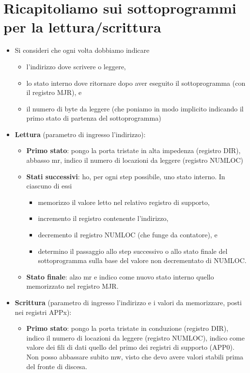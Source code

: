 \documentclass[11pt]{report}
\begin{document}
\section{Ricapitoliamo sui sottoprogrammi per la lettura/scrittura}
\begin{itemize}
\item Si consideri che ogni volta dobbiamo indicare
\begin{itemize}
\item l'indirizzo dove scrivere o leggere,
\item lo stato interno dove ritornare dopo aver eseguito il sottoprogramma (con il registro MJR), e 
\item il numero di byte da leggere (che poniamo in modo implicito indicando il primo stato di partenza del sottoprogramma)
\end{itemize}
\item \textbf{Lettura} (parametro di ingresso l'indirizzo):
\begin{itemize}
\item \textbf{Primo stato}: pongo la porta tristate in alta impedenza (registro DIR), abbasso mr, indico il numero di locazioni da leggere (registro NUMLOC)
\item \textbf{Stati successivi}: ho, per ogni step possibile, uno stato interno. In ciascuno di essi
\begin{itemize}
\item memorizzo il valore letto nel relativo registro di supporto,
\item incremento il registro contenente l'indirizzo,
\item decremento il registro NUMLOC (che funge da contatore), e
\item determino il passaggio allo step successivo o allo stato finale del sottoprogramma sulla base del valore non decrementato di NUMLOC.
\end{itemize}
\item \textbf{Stato finale}: alzo mr e indico come nuovo stato interno quello memorizzato nel registro MJR.
\end{itemize}
\item \textbf{Scrittura} (parametro di ingresso l'indirizzo e i valori da memorizzare, posti nei registri APPx):
\begin{itemize}
\item \textbf{Primo stato}: pongo la porta tristate in conduzione (registro DIR), indico il numero di locazioni da leggere (registro NUMLOC), indico come valore dei fili di dati quello del primo dei registri di supporto (APP0). Non posso abbassare subito mw, visto che devo avere valori stabili prima del fronte di discesa.

\end{itemize}
\end{itemize}
\end{document}
